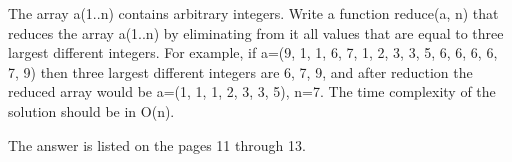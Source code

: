 \documentclass{article}
\begin{document}
		The array a(1..n) contains arbitrary integers. Write a function reduce(a, n) that reduces the array a(1..n) by eliminating from it all values that are equal to three largest different integers. For example, if a=(9, 1, 1, 6, 7, 1, 2, 3, 3, 5, 6, 6, 6, 6, 7, 9) then three largest different integers are 6, 7, 9, and after reduction the reduced array would be a=(1, 1, 1, 2, 3, 3, 5), n=7. The time complexity of the solution should be in O(n). 
		\newline
		
		The answer is listed on the pages 11 through 13.
		
	\ttfamily\
	
\paragraph{}\
\paragraph{}\
\paragraph{}\
\paragraph{}\
\paragraph{}\
\paragraph{}\
\paragraph{}\
\paragraph{}\
\paragraph{}\
\paragraph{}\
\paragraph{}\	
\end{document}
